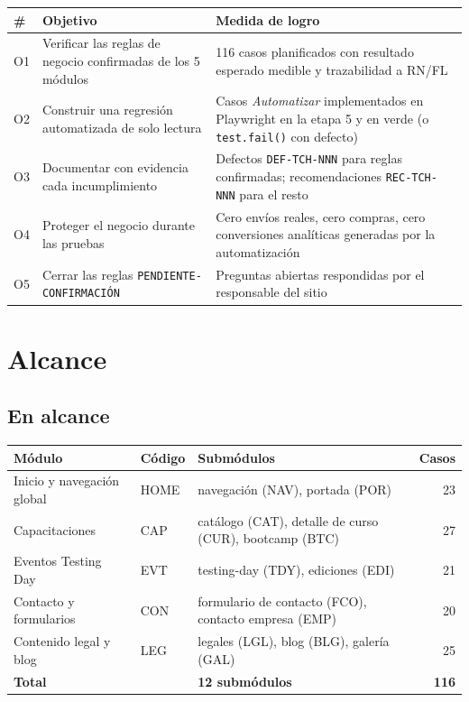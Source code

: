 \documentclass[11pt,a4paper]{article}
\begin{document}
\begin{table}[H]
\centering\small
\begin{tabularx}{\textwidth}{@{}l X X@{}}
\toprule
\# & Objetivo & Medida de logro \\
\midrule
O1 & Verificar las reglas de negocio confirmadas de los 5 módulos & 116 casos planificados con resultado esperado medible y trazabilidad a RN/FL \\
O2 & Construir una regresión automatizada de solo lectura & Casos \textit{Automatizar} implementados en Playwright en la etapa 5 y en verde (o \texttt{test.fail()} con defecto) \\
O3 & Documentar con evidencia cada incumplimiento & Defectos \texttt{DEF-TCH-NNN} para reglas confirmadas; recomendaciones \texttt{REC-TCH-NNN} para el resto \\
O4 & Proteger el negocio durante las pruebas & Cero envíos reales, cero compras, cero conversiones analíticas generadas por la automatización \\
O5 & Cerrar las reglas \texttt{PENDIENTE-CONFIRMACIÓN} & Preguntas abiertas respondidas por el responsable del sitio \\
\bottomrule
\end{tabularx}
\end{table}

\section{Alcance}

\subsection{En alcance}

\begin{table}[H]
\centering\small
\begin{tabularx}{\textwidth}{@{}X l X r@{}}
\toprule
Módulo & Código & Submódulos & Casos \\
\midrule
Inicio y navegación global & HOME & navegación (NAV), portada (POR) & 23 \\
Capacitaciones & CAP & catálogo (CAT), detalle de curso (CUR), bootcamp (BTC) & 27 \\
Eventos Testing Day & EVT & testing-day (TDY), ediciones (EDI) & 21 \\
Contacto y formularios & CON & formulario de contacto (FCO), contacto empresa (EMP) & 20 \\
Contenido legal y blog & LEG & legales (LGL), blog (BLG), galería (GAL) & 25 \\
\midrule
\textbf{Total} & & \textbf{12 submódulos} & \textbf{116} \\
\bottomrule
\end{tabularx}
\end{table}
\end{document}
